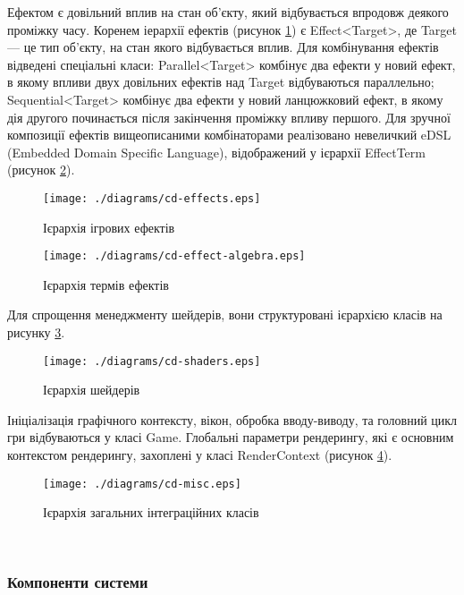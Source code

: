 Ефектом є довільний вплив на стан об'єкту, який відбувається впродовж деякого проміжку часу. Коренем іерархії ефектів (рисунок \ref{fig:cd-effects}) є Effect<Target>, де Target — це тип об'єкту, на стан якого відбувається вплив.
Для комбінування ефектів відведені спеціальні класи:
Parallel<Target> комбінує два ефекти у новий ефект, в якому впливи двух довільних ефектів над Target відбуваються параллельно;
Sequential<Target> комбінує два ефекти у новий ланцюжковий ефект, в якому дія другого починається після закінчення проміжку впливу першого.
	Для зручної композиції ефектів вищеописаними комбінаторами реалізовано невеличкий eDSL (Embedded Domain Specific Language), відображений у ієрархії EffectTerm (рисунок \ref{fig:cd-effect-algebra}).

\begin{figure}[here]
  \centering\texttt{[image: ./diagrams/cd-effects.eps]}
  \caption{Ієрархія ігрових ефектів}
  \label{fig:cd-effects}
\end{figure}

\begin{figure}[here]
  \centering\texttt{[image: ./diagrams/cd-effect-algebra.eps]}
  \caption{Ієрархія термів ефектів}
  \label{fig:cd-effect-algebra}
\end{figure}

Для спрощення менеджменту шейдерів, вони структуровані ієрархією класів на рисунку \ref{fig:cd-shaders}.

\begin{figure}[here]
  \centering\texttt{[image: ./diagrams/cd-shaders.eps]}
  \caption{Ієрархія шейдерів}
  \label{fig:cd-shaders}
\end{figure}

Ініціалізація графічного контексту, вікон, обробка вводу-виводу, та головний цикл гри відбуваються у класі Game. Глобальні параметри рендерингу, які є основним контекстом рендерингу, захоплені у класі RenderContext (рисунок \ref{fig:cd-misc}).

\begin{figure}[here]
  \centering\texttt{[image: ./diagrams/cd-misc.eps]}
  \caption{Ієрархія загальних інтеграційних класів}
  \label{fig:cd-misc}
\end{figure}

~
\newpage
\subsubsection{Компоненти системи}

